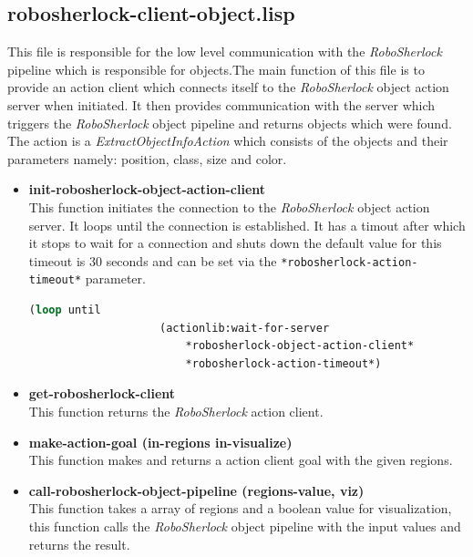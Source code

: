 \documentclass[main.tex]{subfiles}
\begin{document}
		\subsection{robosherlock-client-object.lisp}
		\label{object-perceive}
		This file is responsible for the low level communication with the \textit{RoboSherlock} pipeline which is responsible for objects.The main function of this file is to provide an action client which connects itself to the \textit{RoboSherlock} object action server when initiated. It then provides communication with the server which triggers the \textit{RoboSherlock} object pipeline and returns objects which were found. The action is a \textit{ExtractObjectInfoAction} which consists of the objects and their parameters namely: position, class, size and color.
		\begin{itemize}
			\item \textbf{init-robosherlock-object-action-client} \\
			This function initiates the connection to the \textit{RoboSherlock} object action server. It loops until the connection is established. It has a timout after which it stops to wait for a connection and shuts down the default value for this timeout is 30 seconds and can be set via the \texttt{*robosherlock-action-timeout*} parameter.
			\begin{lstlisting}[language=lisp]
				(loop until 
					(actionlib:wait-for-server 
						*robosherlock-object-action-client*
						*robosherlock-action-timeout*)
			\end{lstlisting}
			\item \textbf{get-robosherlock-client} \\
			This function returns the \textit{RoboSherlock} action client.
			\item \textbf{make-action-goal (in-regions in-visualize)} \\
			This function makes and returns a action client goal with the given regions.
			\item \textbf{call-robosherlock-object-pipeline (regions-value, viz)} \\
			This function takes a array of regions and a boolean value for visualization, this function calls the \textit{RoboSherlock} object pipeline with the input values and returns the result.
		\end{itemize}
\end{document}
